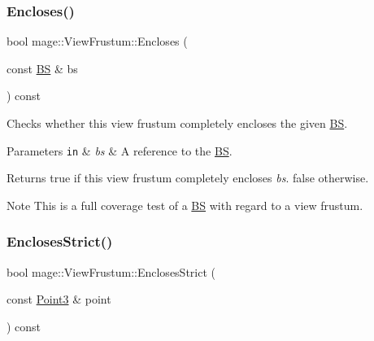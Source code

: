 \subsubsection{\texorpdfstring{Encloses()}{Encloses()}\hspace{0.1cm}{\footnotesize\ttfamily [4/4]}}
{\footnotesize\ttfamily bool mage\+::\+View\+Frustum\+::\+Encloses (\begin{DoxyParamCaption}\item[{const \hyperlink{structmage_1_1_b_s}{BS} \&}]{bs }\end{DoxyParamCaption}) const\hspace{0.3cm}{\ttfamily [noexcept]}}

Checks whether this view frustum completely encloses the given \hyperlink{structmage_1_1_b_s}{BS}.


\begin{DoxyParams}[1]{Parameters}
\mbox{\tt in}  & {\em bs} & A reference to the \hyperlink{structmage_1_1_b_s}{BS}. \\
\hline
\end{DoxyParams}
\begin{DoxyReturn}{Returns}
{\ttfamily true} if this view frustum completely encloses {\itshape bs}. {\ttfamily false} otherwise. 
\end{DoxyReturn}
\begin{DoxyNote}{Note}
This is a full coverage test of a \hyperlink{structmage_1_1_b_s}{BS} with regard to a view frustum. 
\end{DoxyNote}
\hypertarget{structmage_1_1_view_frustum_ab0df90a890172361fb520d4527d81546}{}\label{structmage_1_1_view_frustum_ab0df90a890172361fb520d4527d81546} 
\subsubsection{\texorpdfstring{Encloses\+Strict()}{EnclosesStrict()}\hspace{0.1cm}{\footnotesize\ttfamily [1/4]}}
{\footnotesize\ttfamily bool mage\+::\+View\+Frustum\+::\+Encloses\+Strict (\begin{DoxyParamCaption}\item[{const \hyperlink{structmage_1_1_point3}{Point3} \&}]{point }\end{DoxyParamCaption}) const\hspace{0.3cm}{\ttfamily [noexcept]}}

